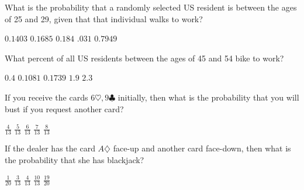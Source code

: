 \documentclass[answers,12pt]{exam}
\begin{document}
\begin{questions}
\question
What is the probability that a randomly selected US resident
is between the ages of 25 and 29, given that that individual
walks to work?\\
\begin{oneparchoices}
\choice $0.1403$ %
\correctchoice $0.1685$
\choice $0.184$ %
\choice $.031$ %
\choice $0.7949$ %
\end{oneparchoices}

\question\label{LastWalk}
What percent of all US residents between the ages
of 45 and 54 bike to work?\\
\begin{oneparchoices}
\correctchoice $0.4$
\choice $0.1081$ %
\choice $0.1739$ %
\choice $1.9$ %
\choice $2.3$ %
\end{oneparchoices}


\question\label{FirstBJ}
If you receive the cards $6\heartsuit,9\clubsuit$
initially, then what is the probability that you will bust if you
request another card?\\
\begin{oneparchoices}
\choice $\frac{4}{13}$
\choice $\frac{5}{13}$
\choice $\frac{6}{13}$ %
\correctchoice $\frac{7}{13}$
\choice $\frac{8}{13}$ %
\end{oneparchoices}

\question\label{LastBJ}
If the dealer has the card $A\diamondsuit$
face-up and another card face-down, then what is the probability
that she has blackjack?\\
\begin{oneparchoices}
\choice $\frac{1}{20}$ %
\choice $\frac{3}{13}$ %
\correctchoice $\frac{4}{13}$
\choice $\frac{10}{13}$
\choice $\frac{19}{20}$ %
\end{oneparchoices}

\end{questions}
\end{document}
